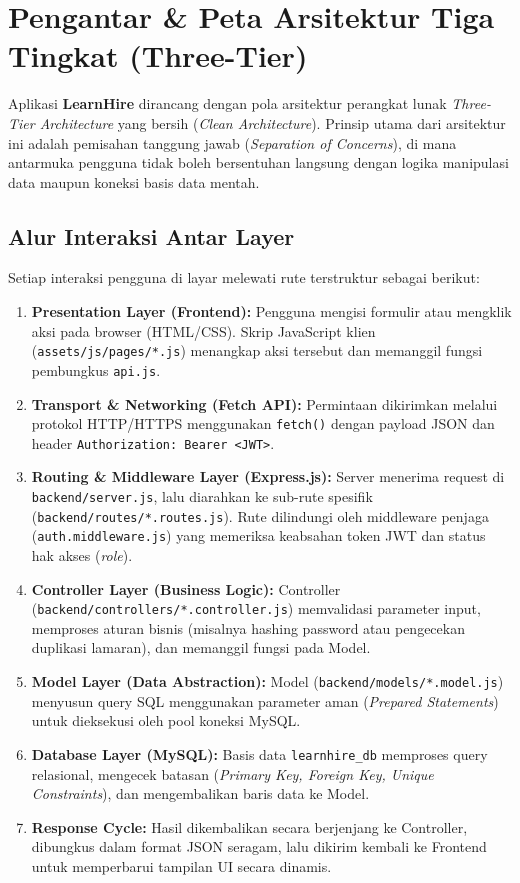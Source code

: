 \documentclass[11pt,a4paper]{article}
\begin{document}
\newpage
\tableofcontents
\newpage

\section{Pengantar \& Peta Arsitektur Tiga Tingkat (Three-Tier)}

Aplikasi \textbf{LearnHire} dirancang dengan pola arsitektur perangkat lunak \textit{Three-Tier Architecture} yang bersih (\textit{Clean Architecture}). Prinsip utama dari arsitektur ini adalah pemisahan tanggung jawab (\textit{Separation of Concerns}), di mana antarmuka pengguna tidak boleh bersentuhan langsung dengan logika manipulasi data maupun koneksi basis data mentah.

\subsection{Alur Interaksi Antar Layer}
Setiap interaksi pengguna di layar melewati rute terstruktur sebagai berikut:
\begin{enumerate}[leftmargin=*]
    \item \textbf{Presentation Layer (Frontend):} Pengguna mengisi formulir atau mengklik aksi pada browser (HTML/CSS). Skrip JavaScript klien (\texttt{assets/js/pages/*.js}) menangkap aksi tersebut dan memanggil fungsi pembungkus \texttt{api.js}.
    \item \textbf{Transport \& Networking (Fetch API):} Permintaan dikirimkan melalui protokol HTTP/HTTPS menggunakan \texttt{fetch()} dengan payload JSON dan header \texttt{Authorization: Bearer <JWT>}.
    \item \textbf{Routing \& Middleware Layer (Express.js):} Server menerima request di \texttt{backend/server.js}, lalu diarahkan ke sub-rute spesifik (\texttt{backend/routes/*.routes.js}). Rute dilindungi oleh middleware penjaga (\texttt{auth.middleware.js}) yang memeriksa keabsahan token JWT dan status hak akses (\textit{role}).
    \item \textbf{Controller Layer (Business Logic):} Controller (\texttt{backend/controllers/*.controller.js}) memvalidasi parameter input, memproses aturan bisnis (misalnya hashing password atau pengecekan duplikasi lamaran), dan memanggil fungsi pada Model.
    \item \textbf{Model Layer (Data Abstraction):} Model (\texttt{backend/models/*.model.js}) menyusun query SQL menggunakan parameter aman (\textit{Prepared Statements}) untuk dieksekusi oleh pool koneksi MySQL.
    \item \textbf{Database Layer (MySQL):} Basis data \texttt{learnhire\_db} memproses query relasional, mengecek batasan (\textit{Primary Key, Foreign Key, Unique Constraints}), dan mengembalikan baris data ke Model.
    \item \textbf{Response Cycle:} Hasil dikembalikan secara berjenjang ke Controller, dibungkus dalam format JSON seragam, lalu dikirim kembali ke Frontend untuk memperbarui tampilan UI secara dinamis.
\end{enumerate}
\end{document}
